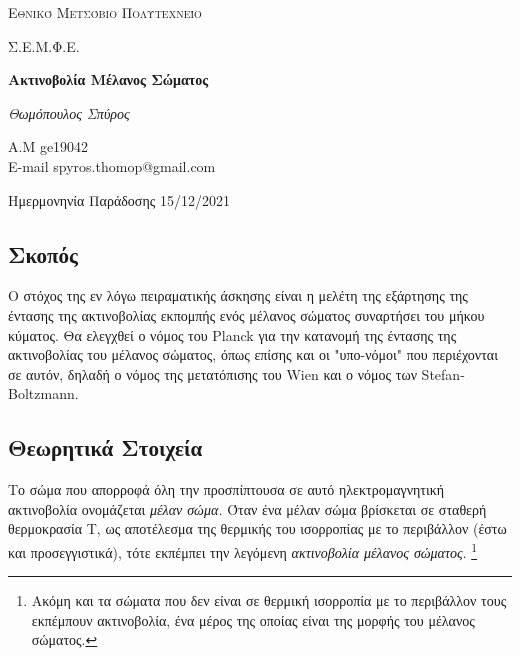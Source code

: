 \documentclass[a4paper]{article}
\begin{document}
\begin{titlepage}			%
	\centering
	{\scshape\LARGE Εθνικό Μετσόβιο Πολυτεχνείο\par}
	{\scshape \LARGE Σ.Ε.Μ.Φ.Ε.\par}
	\vspace{1cm}
	{\huge\bfseries Ακτινοβολία Μέλανος Σώματος \par}
	\vspace{1cm}
	{\Large\itshape Θωμόπουλος Σπύρος\par}		%
	
	{\large A.M ge19042 \hfill \\ E-mail spyros.thomop@gmail.com \\}%
	\vspace{1cm}
	{\large Ημερμονηνία Παράδοσης 15/12/2021\par}
\end{titlepage}


\newpage 

\subsection*{Σκοπός}
Ο στόχος της εν λόγω πειραματικής άσκησης είναι η μελέτη της εξάρτησης της έντασης της ακτινοβολίας εκπομπής ενός μέλανος σώματος συναρτήσει του μήκου κύματος. Θα ελεγχθεί ο νόμος του Planck για την κατανομή της έντασης της ακτινοβολίας του μέλανος σώματος, όπως επίσης και οι "υπο-νόμοι" που περιέχονται σε αυτόν, δηλαδή ο νόμος της μετατόπισης του Wien και ο νόμος των Stefan-Boltzmann.

\subsection*{Θεωρητικά Στοιχεία}
Το σώμα που απορροφά όλη την προσπίπτουσα σε αυτό ηλεκτρομαγνητική ακτινοβολία ονομάζεται \textit{μέλαν σώμα.} Όταν ένα μέλαν σώμα βρίσκεται σε σταθερή θερμοκρασία Τ, ως αποτέλεσμα της θερμικής του ισορροπίας με το περιβάλλον (έστω και προσεγγιστικά), τότε εκπέμπει την λεγόμενη \textit{ακτινοβολία μέλανος σώματος}. \footnote{Ακόμη και τα σώματα που δεν είναι σε θερμική ισορροπία με το περιβάλλον τους εκπέμπουν ακτινοβολία, ένα μέρος της οποίας είναι της μορφής του μέλανος σώματος.}
\end{document}
